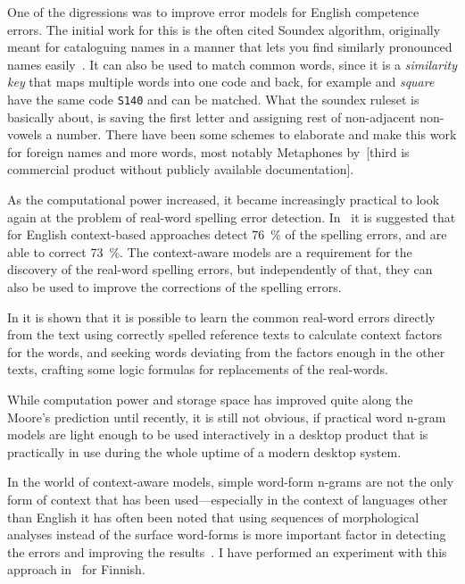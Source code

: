 \documentclass[officiallayout]{unihelcompling}
\newcommand\misspelt{\bgroup\markoverwith
{\textcolor{red}{\lower3.5pt\hbox{\sixly \char58}}}\ULon}
\begin{document}
One of the digressions was to improve error models for English competence
errors. The initial work for this is the often cited Soundex algorithm,
originally meant for cataloguing names in a manner that lets you find similarly
pronounced names easily~\citep{russell1918soundex}. It can also be used to
match common words, since it is a \emph{similarity key} that maps multiple
words into one code and back, for example \misspelt{squer} and \emph{square}
have the same code \texttt{S140} and can be matched. What the soundex ruleset
is basically about, is saving the first letter and assigning rest of
non-adjacent non-vowels a number. There have been some schemes to elaborate and
make this work for foreign names and more words, most notably Metaphones 
by~\citet{philips1990hanging,philips2000double}[third is commercial product
without publicly available documentation].

As the computational power increased, it became increasingly practical to look
again at the problem of real-word spelling error detection.
In~\citet{mays1991context} it is suggested that for English context-based
approaches detect 76~\% of the spelling errors, and are able to correct 73~\%.
The context-aware models are a requirement for the discovery of the real-word
spelling errors, but independently of that, they can also be used to improve
the corrections of the spelling errors. 

In \citet{al2006learning} it is shown that it is possible to learn the common
real-word errors directly from the text using correctly spelled reference texts
to calculate context factors for the words, and seeking words deviating from
the factors enough in the other texts, crafting some logic formulas for
replacements of the real-words.

While computation power and storage space has improved quite along the Moore's
prediction until recently, it is still not obvious, if practical word n-gram
models are light enough to be used interactively in a desktop product that is
practically in use during the whole uptime of a modern desktop system.

In the world of context-aware models, simple word-form n-grams are not the only
form of context that has been used---especially in the context of languages
other than English it has often been noted that using sequences of
morphological analyses instead of the surface word-forms is more important
factor in detecting the errors and improving the results~\citep[for
Spanish]{otero2007contextual}. I have performed an experiment with this
approach in~ for Finnish.
\end{document}
